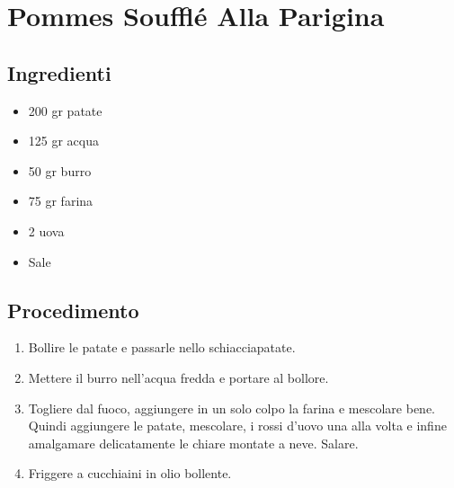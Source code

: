 \section{Pommes Soufflé Alla Parigina}
\subsection{Ingredienti}
\begin{itemize}
\item 200 gr patate  
\item 125 gr acqua  
\item 50 gr burro  
\item 75 gr farina  
\item 2 uova  
\item Sale
\end{itemize}
\subsection{Procedimento}
\begin{enumerate}
\item  Bollire le patate e passarle nello schiacciapatate.  
\item  Mettere il burro nell'acqua fredda e portare al bollore.   
\item  Togliere dal fuoco, aggiungere in un solo colpo la farina e mescolare bene. Quindi aggiungere le patate, mescolare, i rossi d'uovo una alla volta e infine amalgamare delicatamente le chiare montate a neve. Salare.  
\item  Friggere a cucchiaini in olio bollente.
\end{enumerate}
